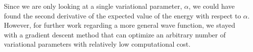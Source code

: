 Since we are only looking at a single variational parameter, $\alpha$, we could have found the second derivative of the expected value of the energy with respect to $\alpha$. However, for further work regarding a more general wave function, we stayed with a gradient descent method that can optimize an arbitrary number of variational parameters with relatively low computational cost. 







